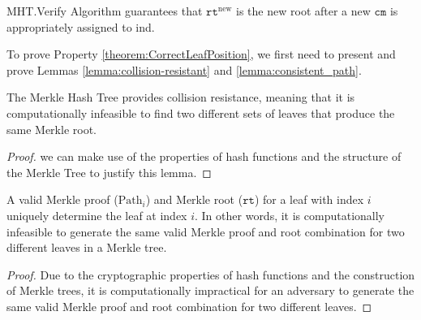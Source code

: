 \begin{property}
\label{theorem:CorrectLeafPosition}
\textsf{MHT}.\textsf{Verify} Algorithm guarantees that $\texttt{rt}^\text{new}$ is the new root after a new $\texttt{cm}$ is appropriately assigned to  \textsf{ind}.

\end{property}

To prove Property \ref{theorem:CorrectLeafPosition}, we first need to present and prove Lemmas \ref{lemma:collision-resistant} and \ref{lemma:consistent_path}.


\begin{lemma}\label{lemma:collision-resistant}
	The Merkle Hash Tree provides collision resistance, meaning that it is computationally infeasible to find two different sets of leaves that produce the same Merkle root. 
\end{lemma}
\begin{proof}
    we can make use of the properties of hash functions and the structure of the Merkle Tree to justify this lemma.
\end{proof}


\begin{lemma}\label{lemma:consistent_path}
	 A valid Merkle proof ($\text{Path}_i$) and Merkle root ($\texttt{rt}$) for a leaf with index $i$ uniquely determine the leaf at index $i$. In other words, it is computationally infeasible to generate the same valid Merkle proof and root combination for two different leaves in a Merkle tree.
\end{lemma}
\begin{proof}
    Due to the cryptographic properties of hash functions and the construction of Merkle trees, it is computationally impractical for an adversary to generate the same valid Merkle proof and root combination for two different leaves.
\end{proof}

